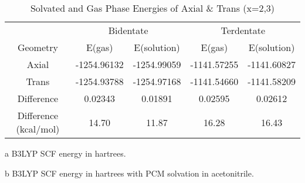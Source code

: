 \begin{table}[!h]
 \begin{threeparttable}
  \caption{Solvated and Gas Phase Energies of Axial \& Trans  (x=2,3)}
  \centering
    \begin{tabular}{ccccc}
    \toprule
     & \multicolumn{2}{c}{Bidentate} & \multicolumn{2}{c}{Terdentate} \\ \cline{2-5} 
    Geometry & E(gas)\tnote{a} & E(solution)\tnote{b} & E(gas)\tnote{a} & E(solution)\tnote{b} \\ \midrule
    Axial & -1254.96132 & -1254.99059 & -1141.57255 & -1141.60827 \\
    Trans & -1254.93788 & -1254.97168 & -1141.54660 & -1141.58209 \\
    Difference & 0.02343 & 0.01891 & 0.02595 & 0.02612 \\  \midrule
    Difference (kcal/mol) & 14.70 & 11.87 & 16.28 & 16.43 \\
    \bottomrule
    \end{tabular}%
    \begin{tablenotes}
    \item [a] B3LYP SCF energy in hartrees.
    \item [b] B3LYP SCF energy in hartrees with PCM solvation in acetonitrile.
    \end{tablenotes}
  \label{tab.cneng}%
 \end{threeparttable}
\end{table}%


